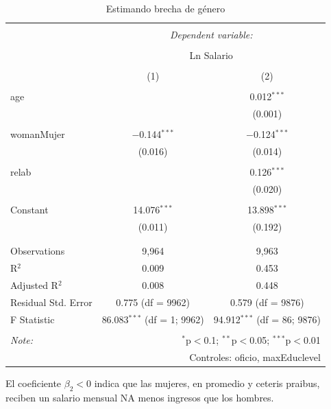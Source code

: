 \documentclass[
  11pt,
  letterpaper,
]{article}
\begin{document}
\begin{table}[H] \centering 
  \caption{Estimando brecha de género} 
  \label{} 
\begin{tabular}{@{\extracolsep{5pt}}lcc} 
\\[-1.8ex]\hline 
\hline \\[-1.8ex] 
 & \multicolumn{2}{c}{\textit{Dependent variable:}} \\ 
\cline{2-3} 
\\[-1.8ex] & \multicolumn{2}{c}{Ln Salario} \\ 
\\[-1.8ex] & (1) & (2)\\ 
\hline \\[-1.8ex] 
 age &  & 0.012$^{***}$ \\ 
  &  & (0.001) \\ 
  & & \\ 
 womanMujer & $-$0.144$^{***}$ & $-$0.124$^{***}$ \\ 
  & (0.016) & (0.014) \\ 
  & & \\ 
 relab &  & 0.126$^{***}$ \\ 
  &  & (0.020) \\ 
  & & \\ 
 Constant & 14.076$^{***}$ & 13.898$^{***}$ \\ 
  & (0.011) & (0.192) \\ 
  & & \\ 
\hline \\[-1.8ex] 
Observations & 9,964 & 9,963 \\ 
R$^{2}$ & 0.009 & 0.453 \\ 
Adjusted R$^{2}$ & 0.008 & 0.448 \\ 
Residual Std. Error & 0.775 (df = 9962) & 0.579 (df = 9876) \\ 
F Statistic & 86.083$^{***}$ (df = 1; 9962) & 94.912$^{***}$ (df = 86; 9876) \\ 
\hline 
\hline \\[-1.8ex] 
\textit{Note:}  & \multicolumn{2}{r}{$^{*}$p$<$0.1; $^{**}$p$<$0.05; $^{***}$p$<$0.01} \\ 
 & \multicolumn{2}{r}{Controles: oficio, maxEduclevel} \\ 
\end{tabular} 
\end{table}

El coeficiente \(\beta_2<0\) indica que las mujeres, en promedio y
ceteris praibus, reciben un salario mensual NA menos ingresos que los
hombres.
\end{document}
